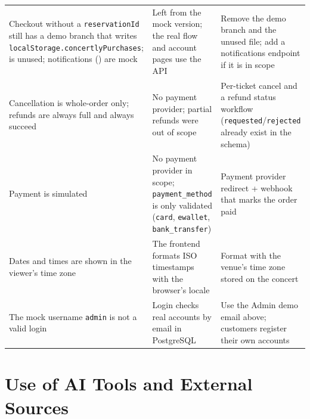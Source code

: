 \documentclass[11pt,a4paper]{article}
\newcommand{\code}[1]{\begingroup\let\codeus\_\renewcommand{\_}{\codeus\allowbreak}\texttt{#1}\endgroup}
\begin{document}
{\begin{xltabular}{\linewidth}{@{}Y Y Y@{}}
Checkout without a \code{reservationId} still has a demo branch that writes \code{localStorage.\allowbreak{}concertlyPurchases};  is unused; notifications () are mock & Left from the mock version; the real flow and account pages use the API & Remove the demo branch and the unused file; add a notifications endpoint if it is in scope \\
Cancellation is whole-order only; refunds are always full and always succeed & No payment provider; partial refunds were out of scope & Per-ticket cancel and a refund status workflow (\code{requested}/\code{rejected} already exist in the schema) \\
Payment is simulated & No payment provider in scope; \code{payment\_method} is only validated (\code{card}, \code{ewallet}, \code{bank\_transfer}) & Payment provider redirect + webhook that marks the order paid \\
Dates and times are shown in the viewer's time zone & The frontend formats ISO timestamps with the browser's locale & Format with the venue's time zone stored on the concert \\
The mock username \code{admin} is not a valid login & Login checks real accounts by email in PostgreSQL & Use the Admin demo email above; customers register their own accounts \\
\end{xltabular}}


\section{Use of AI Tools and External Sources}
\end{document}
